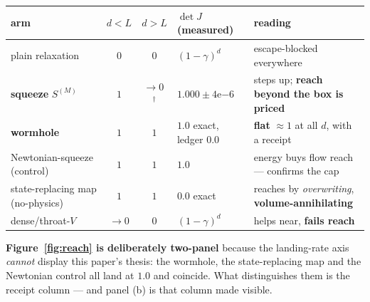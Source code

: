 \documentclass[11pt]{article}
\newcommand{\detJ}{\det J}
\begin{document}
\begin{center}\footnotesize
\begin{tabular}{lccll}
\toprule
arm & $d{<}L$ & $d{>}L$ & $\detJ$ (measured) & reading \\
\midrule
plain relaxation & $0$ & $0$ & $(1{-}\gamma)^d$ & escape-blocked everywhere \\
\textbf{squeeze} $S^{(M)}$ & $1$ & $\to0$\,$^\dagger$ & $1.000\pm4\mathrm{e}{-6}$ & steps up; \textbf{reach beyond the box is priced} \\
\textbf{wormhole} & $1$ & $1$ & $\mathbf{1.0}$ exact, ledger $0.0$ & \textbf{flat} $\approx1$ at all $d$, with a receipt \\
Newtonian-squeeze (control) & $1$ & $1$ & $1.0$ & energy buys flow reach --- confirms the cap \\
state-replacing map (no-physics) & $1$ & $1$ & $\mathbf{0.0}$ exact & reaches by \emph{overwriting}, \textbf{volume-annihilating} \\
dense/throat-$V$ & $\to0$ & $0$ & $(1{-}\gamma)^d$ & helps near, \textbf{fails reach} \\
\bottomrule
\end{tabular}
\end{center}


\textbf{Figure~\ref{fig:reach} is deliberately two-panel} because the landing-rate axis \emph{cannot} display this paper's thesis: the wormhole, the state-replacing map and the Newtonian control all land at $1.0$ and coincide. What distinguishes them is the receipt column --- and panel (b) is that column made visible.
\end{document}

